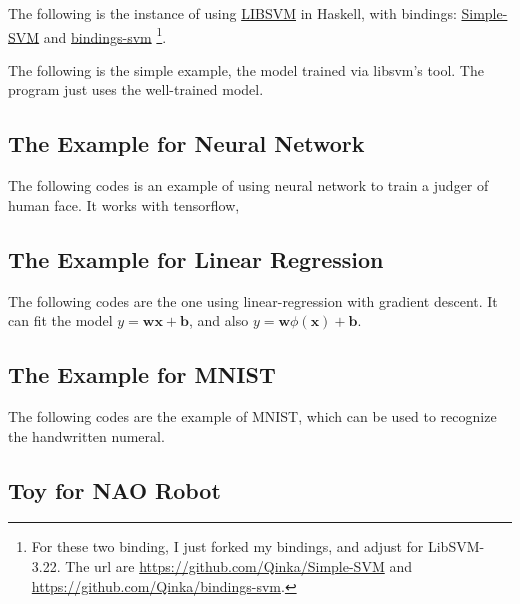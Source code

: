 \documentclass[twoside]{article}
\begin{document}
\begin{appendix}
	The following is the instance of using \href{https://www.csie.ntu.edu.tw/~cjlin/libsvm/index.html}{LIBSVM} in Haskell, with bindings:
	\href{https://github.com/aleator/Simple-SVM}{Simple-SVM} and \href{https://github.com/delanoe/bindings-svm}{bindings-svm}%
	\footnote{For these two binding, I just forked my bindings, and adjust for LibSVM-3.22. The url are \url{https://github.com/Qinka/Simple-SVM} and \url{https://github.com/Qinka/bindings-svm}.}.
	
	The following is the simple example, the model trained via libsvm's tool. The program just uses the well-trained model.
	\setcounter{codeline}{1}
	
	\subsection{The Example for Neural Network}
	\label{code:nn}
	
	The following codes is an example of using neural network to train a judger of human face.
	It works with tensorflow,
	\setcounter{codeline}{1}
	
	\subsection{The Example for Linear Regression}
	\label{code:lr}
	
	The following codes are the one using linear-regression with gradient descent.
	It can fit the model $y = \mathbf{w}\mathbf{x} + \mathbf{b}$, and also $y = \mathbf{w}\phi(\mathbf{x})+\mathbf{b}$.
	\setcounter{codeline}{1}
	\setcounter{codeline}{1}
	\setcounter{codeline}{1}
	
	\subsection{The Example for MNIST}
	\label{code:mnist}
	
	The following codes are the example of MNIST, which can be used to recognize the handwritten numeral.
	\setcounter{codeline}{1}
	
	\subsection{Toy for NAO Robot}
	\label{code:nao}
	

\end{appendix}
\end{document}
